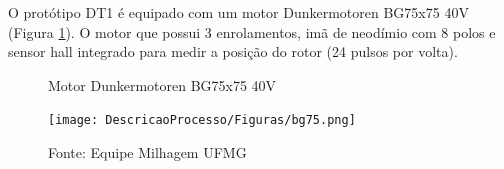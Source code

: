 O protótipo DT1 é equipado com um motor Dunkermotoren BG75x75 40V (Figura \ref{fig:motor_bg75}). O motor que possui 3 enrolamentos, imã de neodímio
com 8 polos e sensor hall integrado para medir a posição do rotor (24 pulsos por volta).


	\begin{figure}[H]
		\centering
		\caption{Motor Dunkermotoren BG75x75 40V}
		\label{fig:motor_bg75}
		\texttt{[image: DescricaoProcesso/Figuras/bg75.png]}
		\caption*{\footnotesize Fonte: Equipe Milhagem UFMG}
	\end{figure}


